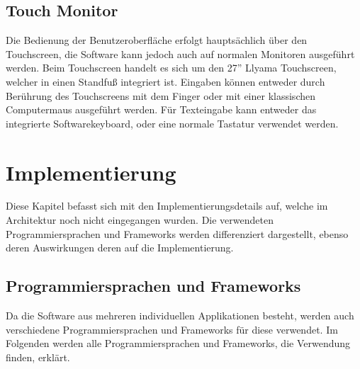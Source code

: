 \documentclass[12pt,a4paper,bibliography=totocnumbered,listof=totocnumbered]{article}
\begin{document}
\subsection{Touch Monitor}
Die Bedienung der Benutzeroberfläche erfolgt hauptsächlich über den Touchscreen, die Software kann jedoch auch auf normalen Monitoren ausgeführt werden.
Beim Touchscreen handelt es sich um den 27'' Llyama Touchscreen, welcher in einen Standfuß integriert ist. 
Eingaben können entweder durch Berührung des Touchscreens mit dem Finger oder mit einer klassischen Computermaus ausgeführt werden.
Für Texteingabe kann entweder das integrierte Softwarekeyboard, oder eine normale Tastatur verwendet werden.

\pagebreak

\section{Implementierung}
Diese Kapitel befasst sich mit den Implementierungsdetails auf, welche im Architektur noch nicht eingegangen wurden. 
Die verwendeten Programmiersprachen und Frameworks werden differenziert dargestellt, ebenso deren Auswirkungen deren auf 
die Implementierung.

\subsection{Programmiersprachen und Frameworks}
Da die Software aus mehreren individuellen Applikationen besteht, werden auch verschiedene Programmiersprachen und Frameworks für diese verwendet.
Im Folgenden werden alle Programmiersprachen und Frameworks, die Verwendung finden, erklärt.
\end{document}
